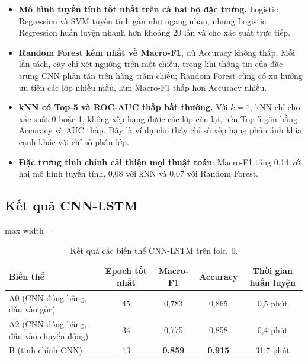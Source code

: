 \begin{itemize}
  \item \textbf{Mô hình tuyến tính tốt nhất trên cả hai bộ đặc trưng.} Logistic Regression và SVM tuyến tính gần như ngang nhau, nhưng Logistic Regression huấn luyện nhanh hơn khoảng 20 lần và cho xác suất trực tiếp.
  \item \textbf{Random Forest kém nhất về Macro-F1}, dù Accuracy không thấp. Mỗi lần tách, cây chỉ xét ngưỡng trên một chiều, trong khi thông tin của đặc trưng CNN phân tán trên hàng trăm chiều; Random Forest cũng có xu hướng ưu tiên các lớp nhiều mẫu, làm Macro-F1 thấp hơn Accuracy nhiều.
  \item \textbf{kNN có Top-5 và ROC-AUC thấp bất thường.} Với $k=1$, kNN chỉ cho xác suất 0 hoặc 1, không xếp hạng được các lớp còn lại, nên Top-5 gần bằng Accuracy và AUC thấp. Đây là ví dụ cho thấy chỉ số xếp hạng phản ánh khía cạnh khác với chỉ số phân lớp.
  \item \textbf{Đặc trưng tinh chỉnh cải thiện mọi thuật toán}: Macro-F1 tăng 0,14 với hai mô hình tuyến tính, 0,08 với kNN và 0,07 với Random Forest.
\end{itemize}

\subsection{Kết quả CNN-LSTM}
\label{subsec:res_cnnlstm}

\begin{table}[H]
  \centering
  \caption{Kết quả các biến thể CNN-LSTM trên fold~0.}
  \label{tab:res_cnnlstm}
  \begin{adjustbox}{max width=\textwidth}
  \begin{tabular}{@{}lcccc@{}}
    \toprule
    \textbf{Biến thể} & \textbf{Epoch tốt nhất} & \textbf{Macro-F1} & \textbf{Accuracy} & \textbf{Thời gian huấn luyện} \\
    \midrule
    A0 (CNN đóng băng, đầu vào gốc) & 45 & 0,783 & 0,865 & 0,5 phút \\
    A2 (CNN đóng băng, đầu vào chuyển động) & 34 & 0,775 & 0,858 & 0,4 phút \\
    B (tinh chỉnh CNN) & 13 & \textbf{0,859} & \textbf{0,915} & 31,7 phút \\
    \bottomrule
  \end{tabular}
  \end{adjustbox}
\end{table}

